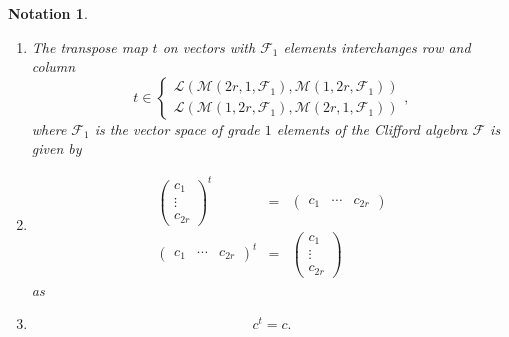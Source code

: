 \documentclass[aps,preprint]{revtex4}
\newtheorem{notation}[theorem]{Notation}
\begin{document}
\begin{notation}
\begin{enumerate}
\item The transpose map $t$ on vectors with $\mathcal{F}_{1}$ elements
interchanges row and column%
\begin{equation}
t\in \left\{ 
\begin{array}{c}
\mathcal{L}\left( \mathcal{M}\left( 2r,1,\mathcal{F}_{1}\right) ,\mathcal{M}%
\left( 1,2r,\mathcal{F}_{1}\right) \right) \\ 
\mathcal{L}\left( \mathcal{M}\left( 1,2r,\mathcal{F}_{1}\right) ,\mathcal{M}%
\left( 2r,1,\mathcal{F}_{1}\right) \right)%
\end{array}%
\right. ,
\end{equation}%
where $\mathcal{F}_{1}$ is the vector space of grade $1$ elements of the
Clifford algebra $\mathcal{F}$ is given by

\item 
\begin{eqnarray}
\left( 
\begin{array}{c}
c_{1} \\ 
\vdots \\ 
c_{2r}%
\end{array}%
\right) ^{t} &=&\left( 
\begin{array}{ccc}
c_{1} & \cdots & c_{2r}%
\end{array}%
\right) \\
\left( 
\begin{array}{ccc}
c_{1} & \cdots & c_{2r}%
\end{array}%
\right) ^{t} &=&\left( 
\begin{array}{c}
c_{1} \\ 
\vdots \\ 
c_{2r}%
\end{array}%
\right)
\end{eqnarray}%
as

\item 
\begin{equation}
c^{t}=c.
\end{equation}
\end{enumerate}
\end{notation}
\end{document}
